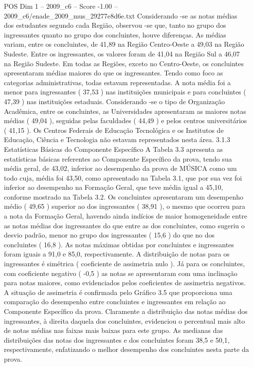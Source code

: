 \begin{textsample}{POS Dim 1 – 2009\_c6 – Score -1.00 – 2009\_c6/enade\_2009\_mus\_29277e8d6e.txt}
Considerando -se as notas médias dos estudantes segundo cada Região, observou -se que, tanto no grupo dos ingressantes quanto no grupo dos concluintes, houve diferenças.
As médias variam, entre os concluintes, de 41,89 na Região Centro-Oeste a 49,03 na Região Sudeste.
Entre os ingressantes, os valores foram de 41,04 na Região Sul a 46,07 na Região Sudeste.
Em todas as Regiões, exceto no Centro-Oeste, os concluintes apresentaram médias maiores do que os ingressantes.
Tendo como foco as categorias administrativas, todas estavam representadas.
A nota média foi a menor para ingressantes ( 37,53 ) nas instituições municipais e para concluintes ( 47,39 ) nas instituições estaduais.
Considerando -se o tipo de Organização Acadêmica, entre os concluintes, as Universidades apresentaram as maiores notas médias ( 49,04 ), seguidas pelas faculdades ( 44,49 ) e pelos centros universitários ( 41,15 ).
Os Centros Federais de Educação Tecnológica e os Institutos de Educação, Ciência e Tecnologia não estavam representados nesta área. 3.1.3 Estatísticas Básicas do Componente Específico A Tabela 3.3 apresenta as estatísticas básicas referentes ao Componente Específico da prova, tendo sua média geral, de 43,02, inferior ao desempenho da prova de MÚSICA como um todo cuja, média foi 43,50, como apresentado na Tabela 3.1, que por sua vez foi inferior ao desempenho na Formação Geral, que teve média igual a 45,10, conforme mostrado na Tabela 3.2.
Os concluintes apresentaram um desempenho médio ( 49,65 ) superior ao dos ingressantes ( 38,91 ), o mesmo que ocorreu para a nota da Formação Geral, havendo ainda indícios de maior homogeneidade entre as notas médias dos ingressantes do que entre as dos concluintes, como sugeriu o desvio padrão, menor no grupo dos ingressantes ( 15,6 ) do que no dos concluintes ( 16,8 ).
As notas máximas obtidas por concluintes e ingressantes foram iguais a 91,0 e 85,0, respectivamente.
A distribuição de notas para os ingressantes é simétrica ( coeficiente de assimetria nulo ).
Já para os concluintes, com coeficiente negativo ( -0,5 ) as notas se apresentaram com uma inclinação para notas maiores, como evidenciados pelos coeficientes de assimetria negativos.
A situação de assimetria é confirmada pelo Gráfico 3.5 que proporciona uma comparação do desempenho entre concluintes e ingressantes em relação ao Componente Específico da prova.
Claramente a distribuição das notas médias dos ingressantes, à direita daquela dos concluintes, evidenciou o percentual mais alto de notas médias nas faixas mais baixas para este grupo.
As medianas das distribuições das notas dos ingressantes e dos concluintes foram 38,5 e 50,1, respectivamente, enfatizando o melhor desempenho dos concluintes nesta parte da prova.

\end{textsample}
